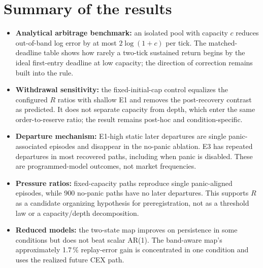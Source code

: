 \section{Summary of the results}

\begin{itemize}
  \item \textbf{Analytical arbitrage benchmark:} an isolated pool with capacity $c$ reduces out-of-band log error by at most $2\log(1+c)$ per tick. The matched-deadline table shows how rarely a two-tick sustained return begins by the ideal first-entry deadline at low capacity; the direction of correction remains built into the rule.
  \item \textbf{Withdrawal sensitivity:} the fixed-initial-cap control equalizes the configured $R$ ratios with shallow E1 and removes the post-recovery contrast as predicted. It does not separate capacity from depth, which enter the same order-to-reserve ratio; the result remains post-hoc and condition-specific.
  \item \textbf{Departure mechanism:} E1-high static later departures are single panic-associated episodes and disappear in the no-panic ablation. E3 has repeated departures in most recovered paths, including when panic is disabled. These are programmed-model outcomes, not market frequencies.
  \item \textbf{Pressure ratios:} fixed-capacity paths reproduce single panic-aligned episodes, while 900 no-panic paths have no later departures. This supports $R$ as a candidate organizing hypothesis for preregistration, not as a threshold law or a capacity/depth decomposition.
  \item \textbf{Reduced models:} the two-state map improves on persistence in some conditions but does not beat scalar AR(1). The band-aware map's approximately 1.7\,\% replay-error gain is concentrated in one condition and uses the realized future CEX path.
\end{itemize}

